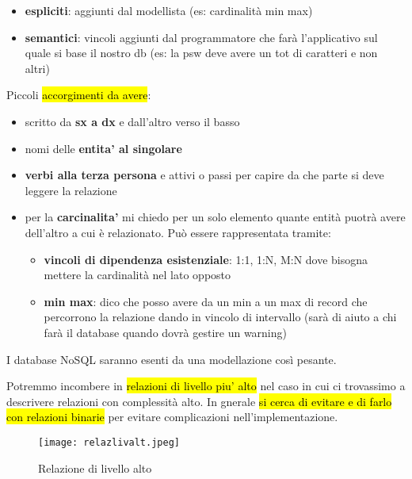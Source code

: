 \begin{itemize}
\begin{itemize}
			\item \textbf{espliciti}: aggiunti dal modellista (es: cardinalità min max)
			
			\item \textbf{semantici}: vincoli aggiunti dal programmatore che farà l'applicativo sul quale si base il nostro db (es: la psw deve avere un tot di caratteri e non altri)
		\end{itemize}
	
\end{itemize}

Piccoli \hl{accorgimenti da avere}:

\begin{itemize}
	\item scritto da \textbf{sx a dx} e dall'altro verso il basso
	
	\item nomi delle \textbf{entita' al singolare}
	
	\item \textbf{verbi alla terza persona} e attivi o passi per capire da che parte si deve leggere la relazione
	
	\item per la \textbf{carcinalita'} mi chiedo per un solo elemento quante entità puotrà avere dell'altro a cui è relazionato. Può essere rappresentata tramite:
	
		\begin{itemize}
			\item \textbf{vincoli di dipendenza esistenziale}: 1:1, 1:N, M:N dove bisogna mettere la cardinalità nel lato opposto
			\item \textbf{min max}: dico che posso avere da un min a un max di record che percorrono la relazione dando in vincolo di intervallo (sarà di aiuto a chi farà il database quando dovrà gestire un warning)
		\end{itemize}
	
	 
\end{itemize}


I database NoSQL saranno esenti da una modellazione così pesante.


Potremmo incombere in \hl{relazioni di livello piu' alto} nel caso in cui ci trovassimo a descrivere relazioni con complessità alto. In gnerale \hl{si cerca di evitare e di farlo con relazioni binarie} per evitare complicazioni nell'implementazione.


\begin{figure}[H]
\centering
\texttt{[image: relazlivalt.jpeg]}
\caption{Relazione di livello alto} 
\label{relazlivalt}
\end{figure}
